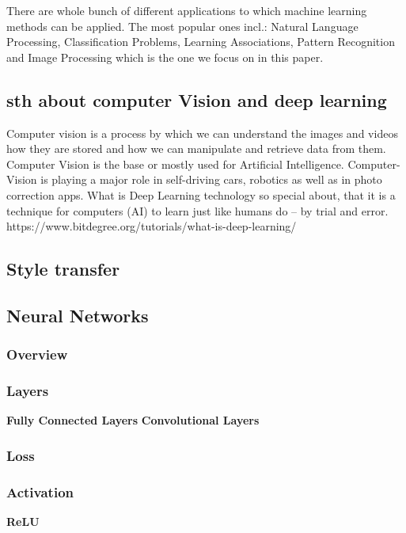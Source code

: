 \documentclass[../Main.tex]{subfiles}
\begin{document}
    There are whole bunch of different applications to which machine learning methods can be applied. The most popular ones incl.: Natural Language Processing, Classification Problems, Learning Associations, Pattern Recognition and Image Processing which is the one we focus on in this paper.

\subsection{sth about computer Vision and deep learning}
    Computer vision is a process by which we can understand the images and videos how they are stored and how we can manipulate and retrieve data from them. Computer Vision is the base or mostly used for Artificial Intelligence. Computer-Vision is playing a major role in self-driving cars, robotics as well as in photo correction apps.
    What is Deep Learning technology so special about, that it is a technique for computers (AI) to learn just like humans do – by trial and error.
    https://www.bitdegree.org/tutorials/what-is-deep-learning/
    
\subsection{Style transfer}

\subsection{Neural Networks}
    \subsubsection{Overview}
    \subsubsection{Layers}
        \textbf{Fully Connected Layers}
        \textbf{Convolutional Layers}
    \subsubsection{Loss} %
    \subsubsection{Activation}
        \textbf{ReLU}
\end{document}
